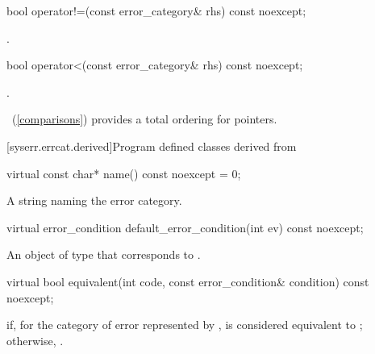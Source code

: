 %
\begin{itemdecl}
bool operator!=(const error_category& rhs) const noexcept;
\end{itemdecl}

\begin{itemdescr}
\pnum
\returns {}.
\end{itemdescr}

%
\begin{itemdecl}
bool operator<(const error_category& rhs) const noexcept;
\end{itemdecl}

\begin{itemdescr}
\pnum
\returns {}.

\begin{note} ~(\ref{comparisons}) provides a total ordering for pointers. \end{note}
\end{itemdescr}

[syserr.errcat.derived]{Program defined classes derived from }

%
\begin{itemdecl}
virtual const char* name() const noexcept = 0;
\end{itemdecl}

\begin{itemdescr}
\pnum
\returns A string naming the error category.
\end{itemdescr}

%
\begin{itemdecl}
virtual error_condition default_error_condition(int ev) const noexcept;
\end{itemdecl}

\begin{itemdescr}
\pnum
\returns An object of type  that corresponds to .
\end{itemdescr}

%
\begin{itemdecl}
virtual bool equivalent(int code, const error_condition& condition) const noexcept;
\end{itemdecl}

\begin{itemdescr}
\pnum
\returns {} if, for the category of error represented by ,  is considered equivalent to ; otherwise, .
\end{itemdescr}

